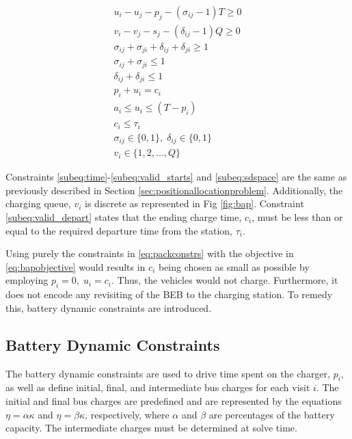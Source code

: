 \documentclass[letterpaper, 10pt, conference]{IEEEtran}
\begin{document}
\begin{subequations}
\label{eq:packconstrs}
\begin{align}
    u_i - u_j - p_j - (\sigma_{ij} - 1)T \geq 0                      \label{subeq:time}         \\
    v_i - v_j - s_j - (\delta_{ij} - 1)Q \geq 0                      \label{subeq:space}        \\
    \sigma_{ij} + \sigma_{ji} + \delta_{ij} + \delta_{ji} \geq 1     \label{subeq:valid_pos}    \\
    \sigma_{ij} + \sigma_{ji} \leq 1                                 \label{subeq:sigma}        \\
    \delta_{ij} + \delta_{ji} \leq 1                                 \label{subeq:delta}        \\
    p_i + u_i = c_i                                                  \label{subeq:detach}       \\
    a_i \leq u_i \leq (T - p_i)                                      \label{subeq:valid_starts} \\
    c_i \leq \tau_i                                                  \label{subeq:valid_depart} \\
    \sigma_{ij} \in \{0,1\},\;\delta_{ij} \in \{0,1\}                \label{subeq:sdspace}      \\
    v_i \in \{1,2, ... , Q\}                                         \label{subeq:vspace}
\end{align}
\end{subequations}

Constraints \eqref{subeq:time}-\eqref{subeq:valid_starts} and \eqref{subeq:sdspace} are the same as previously described in Section \ref{sec:positionallocationproblem}. Additionally, the charging queue, $v_i$ is discrete as represented in Fig \ref{fig:bap}. Constraint \eqref{subeq:valid_depart} states that the ending charge time, $c_i$, must be less than or equal to the required departure time from the station, $\tau_i$.

Using purely the constraints in \eqref{eq:packconstrs} with the objective in \eqref{eq:bapobjective} would results in $c_i$ being chosen as small as possible by employing $p_i = 0,\; u_i = c_i$. Thus, the vehicles would not charge. Furthermore, it does not encode any revisiting of the BEB to the charging station. To remedy this, battery dynamic constraints are introduced.

\subsection{Battery Dynamic Constraints}
The battery dynamic constraints are used to drive time spent on the charger, $p_i$, as well as define initial, final, and intermediate bus charges for each visit $i$. The initial and final bus charges are predefined and are represented by the equations $\eta = \alpha \kappa$ and $\eta = \beta \kappa$, respectively, where $\alpha$ and $\beta$ are percentages of the battery capacity. The intermediate charges must be determined at solve time.
\end{document}
